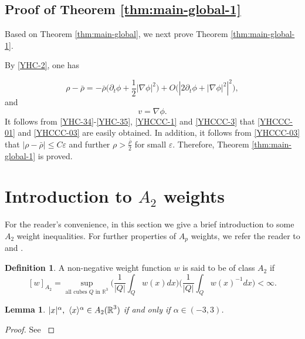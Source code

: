 \documentclass[11pt,twoside]{article}
\def\R{\mathop{\mathbb R\kern 0pt}\nolimits}
\def\f{\frac}
\def\ve{\varepsilon}
\newcommand{\w}[1]{\langle {#1} \rangle}
\theoremstyle{plain}
\newtheorem{lemma}[theorem]{Lemma}
\theoremstyle{definition}
\newtheorem{definition}[theorem]{Definition}
\theoremstyle{assumption}
\numberwithin{equation}{section}
\begin{document}
\subsection{Proof of Theorem \ref{thm:main-global-1}}\label{YHC-33}
	


	
Based on Theorem \ref{thm:main-global}, we next prove Theorem \ref{thm:main-global-1}.


 By \eqref{YHC-2}, one has

\begin{equation}\label{YHC-34}
\rho-\bar\rho
=
-\bar\rho
\big(
\partial_t\phi+\frac12|\nabla\phi|^2
\big)
+
O\big(
\left|2\partial_t\phi+|\nabla\phi|^2\right|^2
\big),
\end{equation}	
and
\begin{equation}\label{YHC-35}
v=\nabla\phi.	
\end{equation}	
It follows from \eqref{YHC-34}-\eqref{YHC-35}, \eqref{YHCCC-1} and \eqref{YHCCC-3} that \eqref{YHCCC-01} and \eqref{YHCCC-03} are easily obtained.
In addition, it follows from \eqref{YHCCC-03} that $|\rho-\bar\rho|
\le C\varepsilon$ and further $\rho>\f{\bar\rho}{2}$ for small $\ve$.
Therefore, Theorem \ref{thm:main-global-1} is proved.
	
	
	\appendix
	
	\section{Introduction to $A_2$ weights}\label{section a}
	For the reader's convenience, in this section we give a brief introduction to some $A_2$ weight inequalities.
	For further properties of $A_p$ weights, we refer the reader to \cite[Chapter 7]{Grafakos} and \cite[Chapter V]{Stein}.
	\begin{definition}
		A non-negative weight function $w$ is said to be of class $A_2$ if
		\begin{equation}\label{def:A_2 weight}
			[w]_{A_2}=\sup_{\text{all cubes $Q$ in } \mathbb{R}^3}\big(\frac{1}{|Q|} \int_Q w(x) dx\big)\big(\frac{1}{|Q|} \int_Q w(x)^{-1} dx\big)<\infty. 	
		\end{equation}
		
	\end{definition}
	\begin{lemma}\label{lem:w{x} in A2}
		$|x|^\alpha,\ \w{x}^{\alpha} \in A_2(\R^3)$ if and only if $\alpha\in(-3,3)$.
	\end{lemma}
	\begin{proof}
		See \cite[Lemma A.2.]{GaoLiYin2026}
	\end{proof}
	
\end{document}
